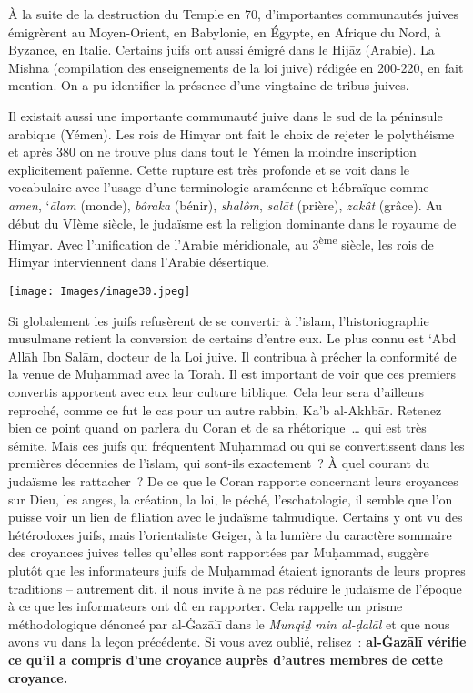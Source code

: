 À la suite de la destruction du Temple en 70, d'importantes communautés
juives émigrèrent au Moyen-Orient, en Babylonie, en Égypte, en Afrique
du Nord, à Byzance, en Italie. Certains juifs ont aussi émigré dans le
Hijāz (Arabie). La Mishna (compilation des enseignements de la loi
juive) rédigée en 200-220, en fait mention. On a pu identifier la
présence d'une vingtaine de tribus juives.

Il existait aussi une importante communauté juive dans le sud de la
péninsule arabique (Yémen). Les rois de Himyar ont fait le choix de
rejeter le polythéisme et après 380 on ne trouve plus dans tout le Yémen
la moindre inscription explicitement païenne. Cette rupture est très
profonde et se voit dans le vocabulaire avec l'usage d'une terminologie
araméenne et hébraïque comme \emph{amen}, `\emph{ālam} (monde),
\emph{bâraka} (bénir), \emph{shalôm}, \emph{salāt} (prière),
\emph{zakât} (grâce). Au début du VIème siècle, le judaïsme est la
religion dominante dans le royaume de Himyar. Avec l'unification de l'Arabie méridionale,
au 3\textsuperscript{ème} siècle, les rois de Himyar interviennent dans
l'Arabie désertique.

\texttt{[image: Images/image30.jpeg]}

Si globalement les juifs refusèrent de se convertir à l'islam,
l'historiographie musulmane retient la conversion de certains d'entre
eux. Le plus connu est `Abd Allāh Ibn Salām, docteur de la Loi juive. Il
contribua à prêcher la conformité de la venue de Muḥammad avec la Torah.
Il est important de voir que ces premiers convertis apportent avec eux
leur culture biblique. Cela leur sera d'ailleurs reproché, comme ce fut
le cas pour un autre rabbin, Ka'b al-Akhbār. Retenez bien ce point quand
on parlera du Coran et de sa rhétorique~\ldots{} qui est très sémite.
Mais ces juifs qui fréquentent Muḥammad ou qui se convertissent dans les
premières décennies de l'islam, qui sont-ils exactement~? À quel courant
du judaïsme les rattacher~? De ce que le Coran rapporte concernant leurs
croyances sur Dieu, les anges, la création, la loi, le péché,
l'eschatologie, il semble que l'on puisse voir un lien de filiation avec
le judaïsme talmudique. Certains y ont vu des hétérodoxes juifs, mais
l'orientaliste Geiger, à la lumière du
caractère sommaire des croyances juives telles qu'elles sont rapportées
par Muḥammad, suggère plutôt que les informateurs juifs de Muḥammad
étaient ignorants de leurs propres traditions -- autrement dit, il nous
invite à ne pas réduire le judaïsme de l'époque à ce que les
informateurs ont dû en rapporter. Cela rappelle un prisme méthodologique
dénoncé par al-Ġazālī \label{theol:AlGazali24} dans le \emph{Munqiḏ min al-ḍalāl} et que nous
avons vu dans la leçon précédente. Si vous avez oublié, relisez~:
\textbf{al-Ġazālī vérifie ce qu'il a compris d'une croyance auprès
d'autres membres de cette croyance.}

